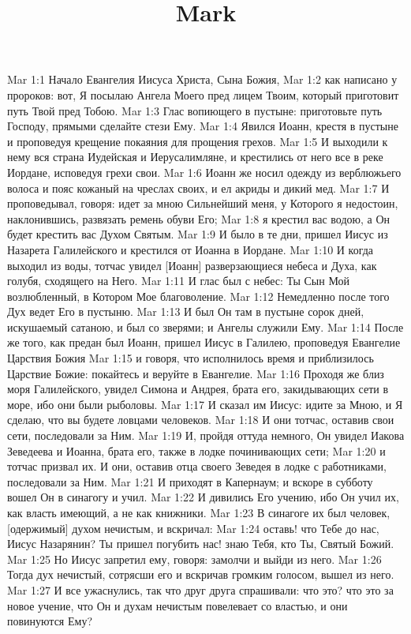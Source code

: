 

\title{Mark}

Mar 1:1  Начало Евангелия Иисуса Христа, Сына Божия,
Mar 1:2  как написано у пророков: вот, Я посылаю Ангела Моего пред лицем Твоим, который приготовит путь Твой пред Тобою.
Mar 1:3  Глас вопиющего в пустыне: приготовьте путь Господу, прямыми сделайте стези Ему.
Mar 1:4  Явился Иоанн, крестя в пустыне и проповедуя крещение покаяния для прощения грехов.
Mar 1:5  И выходили к нему вся страна Иудейская и Иерусалимляне, и крестились от него все в реке Иордане, исповедуя грехи свои.
Mar 1:6  Иоанн же носил одежду из верблюжьего волоса и пояс кожаный на чреслах своих, и ел акриды и дикий мед.
Mar 1:7  И проповедывал, говоря: идет за мною Сильнейший меня, у Которого я недостоин, наклонившись, развязать ремень обуви Его;
Mar 1:8  я крестил вас водою, а Он будет крестить вас Духом Святым.
Mar 1:9  И было в те дни, пришел Иисус из Назарета Галилейского и крестился от Иоанна в Иордане.
Mar 1:10  И когда выходил из воды, тотчас увидел [Иоанн] разверзающиеся небеса и Духа, как голубя, сходящего на Него.
Mar 1:11  И глас был с небес: Ты Сын Мой возлюбленный, в Котором Мое благоволение.
Mar 1:12  Немедленно после того Дух ведет Его в пустыню.
Mar 1:13  И был Он там в пустыне сорок дней, искушаемый сатаною, и был со зверями; и Ангелы служили Ему.
Mar 1:14  После же того, как предан был Иоанн, пришел Иисус в Галилею, проповедуя Евангелие Царствия Божия
Mar 1:15  и говоря, что исполнилось время и приблизилось Царствие Божие: покайтесь и веруйте в Евангелие.
Mar 1:16  Проходя же близ моря Галилейского, увидел Симона и Андрея, брата его, закидывающих сети в море, ибо они были рыболовы.
Mar 1:17  И сказал им Иисус: идите за Мною, и Я сделаю, что вы будете ловцами человеков.
Mar 1:18  И они тотчас, оставив свои сети, последовали за Ним.
Mar 1:19  И, пройдя оттуда немного, Он увидел Иакова Зеведеева и Иоанна, брата его, также в лодке починивающих сети;
Mar 1:20  и тотчас призвал их. И они, оставив отца своего Зеведея в лодке с работниками, последовали за Ним.
Mar 1:21  И приходят в Капернаум; и вскоре в субботу вошел Он в синагогу и учил.
Mar 1:22  И дивились Его учению, ибо Он учил их, как власть имеющий, а не как книжники.
Mar 1:23  В синагоге их был человек, [одержимый] духом нечистым, и вскричал:
Mar 1:24  оставь! что Тебе до нас, Иисус Назарянин? Ты пришел погубить нас! знаю Тебя, кто Ты, Святый Божий.
Mar 1:25  Но Иисус запретил ему, говоря: замолчи и выйди из него.
Mar 1:26  Тогда дух нечистый, сотрясши его и вскричав громким голосом, вышел из него.
Mar 1:27  И все ужаснулись, так что друг друга спрашивали: что это? что это за новое учение, что Он и духам нечистым повелевает со властью, и они повинуются Ему?
